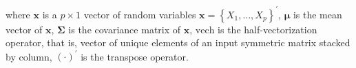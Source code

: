 \noindent where
$\mathbf{x}$ 
is a 
$p \times 1$ 
vector of
random variables 
$\mathbf{x} = \left\{ X_1, \dots, X_p \right\}^{\prime}$,
$\boldsymbol{\mu}$ 
is the mean vector of 
$\mathbf{x}$,
$\boldsymbol{\Sigma}$ 
is the covariance matrix of 
$\mathbf{x}$,
$\mathrm{vech}$ 
is the half-vectorization operator,
that is, vector of unique elements of an input symmetric matrix
stacked by column,
$\left( \cdot \right)^{\prime}$
is the transpose operator.

